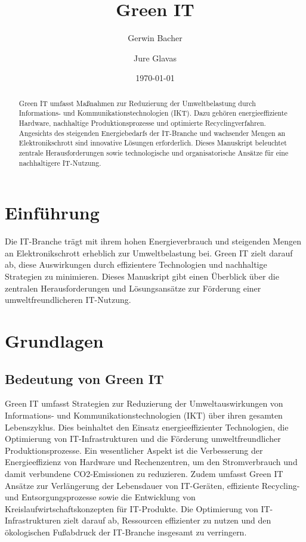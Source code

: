 \documentclass[12pt]{article}
\begin{document}
\title{Green IT}
\author{Gerwin Bacher \and Jure Glavas}
\date{\today}

\maketitle

\begin{abstract}
Green IT umfasst Maßnahmen zur Reduzierung der Umweltbelastung durch Informations- und Kommunikationstechnologien (IKT). Dazu gehören energieeffiziente Hardware, nachhaltige Produktionsprozesse und optimierte Recyclingverfahren. Angesichts des steigenden Energiebedarfs der IT-Branche und wachsender Mengen an Elektronikschrott sind innovative Lösungen erforderlich. Dieses Manuskript beleuchtet zentrale Herausforderungen sowie technologische und organisatorische Ansätze für eine nachhaltigere IT-Nutzung.
\end{abstract}

\section{Einführung}
Die IT-Branche trägt mit ihrem hohen Energieverbrauch und steigenden Mengen an Elektronikschrott erheblich zur Umweltbelastung bei. Green IT zielt darauf ab, diese Auswirkungen durch effizientere Technologien und nachhaltige Strategien zu minimieren. Dieses Manuskript gibt einen Überblick über die zentralen Herausforderungen und Lösungsansätze zur Förderung einer umweltfreundlicheren IT-Nutzung.

\section{Grundlagen}
\subsection{Bedeutung von Green IT}
Green IT umfasst Strategien zur Reduzierung der Umweltauswirkungen von Informations- und Kommunikationstechnologien (IKT) über ihren gesamten Lebenszyklus\cite{murugesan2008}. Dies beinhaltet den Einsatz energieeffizienter Technologien, die Optimierung von IT-Infrastrukturen und die Förderung umweltfreundlicher Produktionsprozesse\cite{tomlinson2010}. Ein wesentlicher Aspekt ist die Verbesserung der Energieeffizienz von Hardware und Rechenzentren, um den Stromverbrauch und damit verbundene CO2-Emissionen zu reduzieren\cite{gartner2007}. Zudem umfasst Green IT Ansätze zur Verlängerung der Lebensdauer von IT-Geräten, effiziente Recycling- und Entsorgungsprozesse sowie die Entwicklung von Kreislaufwirtschaftskonzepten für IT-Produkte\cite{geissdoerfer2010}. Die Optimierung von IT-Infrastrukturen zielt darauf ab, Ressourcen effizienter zu nutzen und den ökologischen Fußabdruck der IT-Branche insgesamt zu verringern\cite{jenkin2011}.
\end{document}
